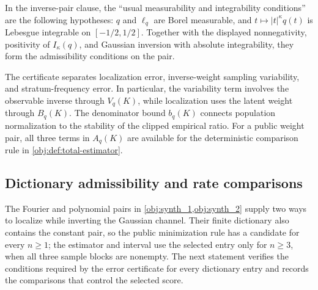 In the inverse-pair clause, the ``usual measurability and integrability conditions'' are the following hypotheses: \(q\) and \(\ell_q\) are Borel measurable, and \(t\mapsto|t|^\kappa q(t)\) is Lebesgue integrable on \([-1/2,1/2]\). Together with the displayed nonnegativity, positivity of \(I_\kappa(q)\), and Gaussian inversion with absolute integrability, they form the admissibility conditions on the pair.

The certificate separates localization error, inverse-weight sampling variability, and stratum-frequency error. In particular, the variability term involves the observable inverse through \(V_q(K)\), while localization uses the latent weight through \(B_q(K)\). The denominator bound \(b_q(K)\) connects population normalization to the stability of the clipped empirical ratio. For a public weight pair, all three terms in \(A_q(K)\) are available for the deterministic comparison rule in \cref{obj:def:total-estimator}.

\subsection{Dictionary admissibility and rate comparisons}

The Fourier and polynomial pairs in \cref{obj:synth_1,obj:synth_2} supply two ways to localize while inverting the Gaussian channel. Their finite dictionary also contains the constant pair, so the public minimization rule has a candidate for every \(n\ge1\); the estimator and interval use the selected entry only for \(n\ge3\), when all three sample blocks are nonempty. The next statement verifies the conditions required by the error certificate for every dictionary entry and records the comparisons that control the selected score.

